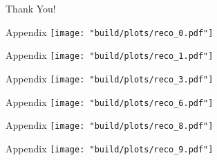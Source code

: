 \documentclass[aspectratio=1610, 9pt]{beamer}
\begin{document}
\begin{frame}
  \begin{center}
    \fontsize{40}{48} \selectfont\textcolor{tugreen}{Thank You!}
  \end{center}
\end{frame}

\begin{frame}[noframenumbering]{Appendix}
    \centering
    \texttt{[image: "build/plots/reco\_0.pdf"]}\\
\end{frame}

\begin{frame}[noframenumbering]{Appendix}
    \centering
    \texttt{[image: "build/plots/reco\_1.pdf"]}\\
\end{frame}

\begin{frame}[noframenumbering]{Appendix}
    \centering
    \texttt{[image: "build/plots/reco\_3.pdf"]}\\
\end{frame}

\begin{frame}[noframenumbering]{Appendix}
    \centering
    \texttt{[image: "build/plots/reco\_6.pdf"]}\\
\end{frame}

\begin{frame}[noframenumbering]{Appendix}
    \centering
    \texttt{[image: "build/plots/reco\_8.pdf"]}\\
\end{frame}

\begin{frame}[noframenumbering]{Appendix}
    \centering
    \texttt{[image: "build/plots/reco\_9.pdf"]}\\
\end{frame}
\end{document}
